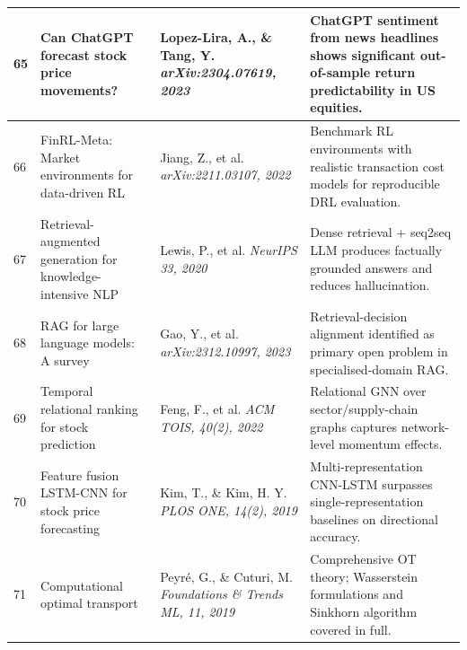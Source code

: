 \documentclass[12pt,a4paper,oneside]{report}
\theoremstyle{definition}
\theoremstyle{remark}
\begin{document}
\begin{center}
\begin{longtable}{|p{0.8cm}|p{4.2cm}|>{\raggedright\arraybackslash}p{4cm}|p{4.5cm}|}
65 & Can ChatGPT forecast stock price movements? \cite{LopezLira2023ChatGPT} & Lopez-Lira, A., \& Tang, Y. \newline\newline \textit{arXiv:2304.07619, 2023} & ChatGPT sentiment from news headlines shows significant out-of-sample return predictability in US equities. \\ \hline

66 & FinRL-Meta: Market environments for data-driven RL \cite{Jiang2022FinRLMeta} & Jiang, Z., et al. \newline\newline \textit{arXiv:2211.03107, 2022} & Benchmark RL environments with realistic transaction cost models for reproducible DRL evaluation. \\ \hline

67 & Retrieval-augmented generation for knowledge-intensive NLP \cite{Lewis2020RAG} & Lewis, P., et al. \newline\newline \textit{NeurIPS 33, 2020} & Dense retrieval + seq2seq LLM produces factually grounded answers and reduces hallucination. \\ \hline

68 & RAG for large language models: A survey \cite{Gao2023RAGSurvey} & Gao, Y., et al. \newline\newline \textit{arXiv:2312.10997, 2023} & Retrieval-decision alignment identified as primary open problem in specialised-domain RAG. \\ \hline

69 & Temporal relational ranking for stock prediction \cite{Feng2022TemporalRelational} & Feng, F., et al. \newline\newline \textit{ACM TOIS, 40(2), 2022} & Relational GNN over sector/supply-chain graphs captures network-level momentum effects. \\ \hline

70 & Feature fusion LSTM-CNN for stock price forecasting \cite{Kim2019CNNLSTMFinance} & Kim, T., \& Kim, H. Y. \newline\newline \textit{PLOS ONE, 14(2), 2019} & Multi-representation CNN-LSTM surpasses single-representation baselines on directional accuracy. \\ \hline

71 & Computational optimal transport \cite{Peyre2019OT} & Peyr\'{e}, G., \& Cuturi, M. \newline\newline \textit{Foundations \& Trends ML, 11, 2019} & Comprehensive OT theory; Wasserstein formulations and Sinkhorn algorithm covered in full. \\ \hline


\end{longtable}
\end{center}
\end{document}
